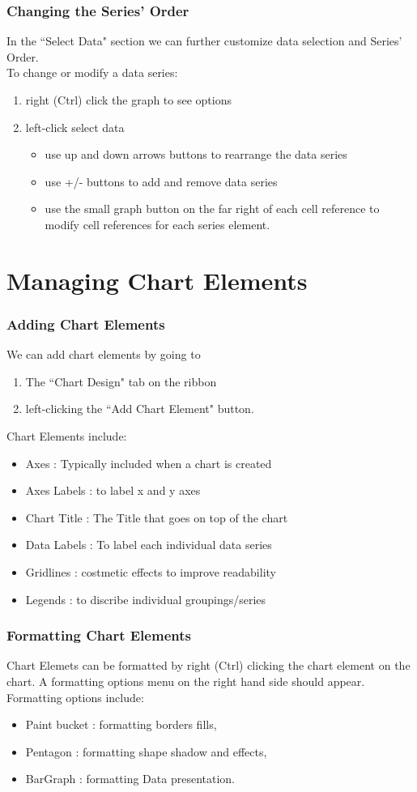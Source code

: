 \documentclass[12pt]{beamer}
\begin{document}
	\begin{frame}
		\frametitle{Changing the Series' Order}
		In the ``Select Data" section we can further customize data selection and Series' Order.  \\
		To change or modify a data series:
		\begin{enumerate}
			\item right (Ctrl) click the graph to see options
			\item left-click select data
			\begin{itemize}
				\item use up and down arrows buttons to rearrange the data series
			\item use +/- buttons to add and remove data series
			\item use the small graph button on the far right of each cell reference to modify cell references for each series element.
			\end{itemize}	
\end{enumerate}
\end{frame}
\section{Managing Chart Elements}
	\begin{frame}
		\frametitle{Adding Chart Elements}
		We can add chart elements by going to
		\begin{enumerate}
			\item The ``Chart Design" tab on the ribbon
			\item left-clicking the ``Add Chart Element" button.
		\end{enumerate}
	Chart Elements include:
	\begin{itemize}
		\item Axes : Typically included when a chart is created
		\item Axes Labels : to label x and y axes
		\item Chart Title : The Title that goes on top of the chart
		\item Data Labels : To label each individual data series 
		\item Gridlines : costmetic effects to improve readability
		\item Legends : to discribe individual groupings/series 
	\end{itemize} 
	\end{frame}

	\begin{frame}
		\frametitle{Formatting Chart Elements}
		Chart Elemets can be formatted by right (Ctrl) clicking the chart element on the chart. A formatting options menu on the right hand side should appear. Formatting options include:
		\begin{itemize}
			\item Paint bucket : formatting borders fills,
			\item Pentagon : formatting shape shadow and effects,
			\item BarGraph : formatting Data presentation.
		\end{itemize}
	\end{frame}
\end{document}
